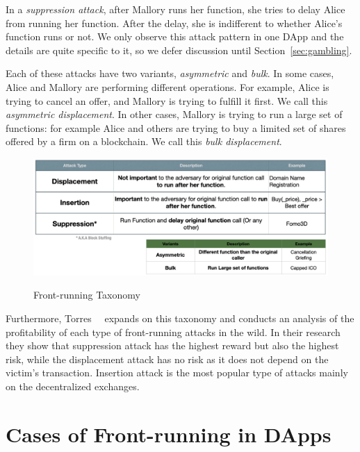 In a \textit{suppression attack}, after Mallory runs her function, she tries to delay Alice from running her function. After the delay, she is indifferent to whether Alice's function runs or not. We only observe this attack pattern in one DApp and the details are quite specific to it, so we defer discussion until Section~\ref{sec:gambling}.

Each of these attacks have two variants, \textit{asymmetric} and \textit{bulk}. In some cases, Alice and Mallory are performing different operations. For example, Alice is trying to cancel an offer, and Mallory is trying to fulfill it first. We call this \textit{asymmetric displacement}. In other cases, Mallory is trying to run a large set of functions: for example Alice and others are trying to buy a limited set of shares offered by a firm on a blockchain. We call this \textit{bulk displacement}. 


\begin{figure}[t]
    \centering
{\includegraphics[width=\textwidth]{figures/frontrunning_taxonomy.png}}
{\caption[Blockchain Front-running Taxonomy]{Front-running Taxonomy}\label{fig:frontrunningtaxonomy}}
\end{figure}


Furthermore, Torres~\etal~\cite{torres2021frontrunner} expands on this taxonomy and conducts an analysis of the profitability of each type of front-running attacks in the wild. In their research they show that suppression attack has the highest reward but also the highest risk, while the displacement attack has no risk as it does not depend on the victim's transaction. Insertion attack is the most popular type of attacks mainly on the decentralized exchanges.


\section{Cases of Front-running in DApps}

